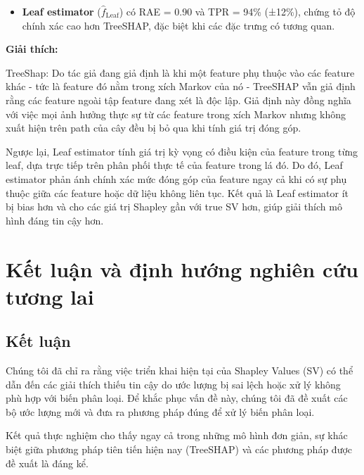 \documentclass[12pt, a4paper]{article}
\begin{document}
\begin{itemize}[align=parleft, left=4em, labelsep=1em, itemsep=1em]
\begin{itemize}[label=$\circ$, left=1em, labelsep=0.75em, itemsep=0.5em]
                \item \textbf{Leaf estimator} ($\hat{f}_{\text{Leaf}}$) có RAE = 0.90 và TPR = 94\% (±12\%), chứng tỏ độ chính xác cao hơn TreeSHAP, đặc biệt khi các đặc trưng có tương quan.  
              \end{itemize}
            
            

            
           \textbf{Giải thích:} 

             TreeShap: Do tác giả đang giả định là khi một feature phụ thuộc vào các feature khác - tức là feature đó nằm trong xích Markov của nó - TreeSHAP vẫn giả định rằng các feature ngoài tập feature đang xét là độc lập. Giả định này đồng nghĩa với việc mọi ảnh hưởng thực sự từ các feature trong xích Markov nhưng không xuất hiện trên path của cây đều bị bỏ qua khi tính giá trị đóng góp.
                        
            Ngược lại, Leaf estimator tính giá trị kỳ vọng có điều kiện của feature trong từng leaf, dựa trực tiếp trên phân phối thực tế của feature trong lá đó. Do đó, Leaf estimator phản ánh chính xác mức đóng góp của feature ngay cả khi có sự phụ thuộc giữa các feature hoặc dữ liệu không liên tục. Kết quả là Leaf estimator ít bị bias hơn và cho các giá trị Shapley gần với true SV hơn, giúp giải thích mô hình đáng tin cậy hơn.


        
    \end{itemize}




\section{Kết luận và định hướng nghiên cứu tương lai}

\subsection{Kết luận}

Chúng tôi đã chỉ ra rằng việc triển khai hiện tại của Shapley Values (SV) có thể dẫn đến các giải thích thiếu tin cậy do ước lượng bị sai lệch hoặc xử lý không phù hợp với biến phân loại. Để khắc phục vấn đề này, chúng tôi đã đề xuất các bộ ước lượng mới và đưa ra phương pháp đúng để xử lý biến phân loại. 

Kết quả thực nghiệm cho thấy ngay cả trong những mô hình đơn giản, sự khác biệt giữa phương pháp tiên tiến hiện nay (TreeSHAP) và các phương pháp được đề xuất là đáng kể.
\end{document}
